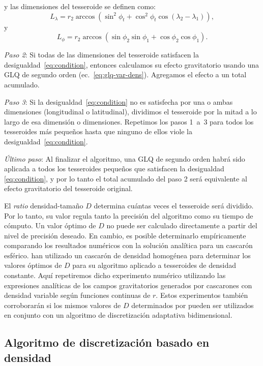 \noindent
y las dimensiones del tesseroide se definen como:
%
\begin{equation}
    L_\lambda = r_2 \arccos(\sin^2\phi_t +
        \cos^2\phi_t\cos(\lambda_2 - \lambda_1)),
    \label{eq:sizelon}
\end{equation}
%
y
%
\begin{equation}
    L_\phi = r_2 \arccos(\sin\phi_2\sin\phi_1 + \cos\phi_2\cos\phi_1).
\end{equation}

\textit{Paso 2}:
Si todas de las dimensiones del tesseroide satisfacen la
desigualdad~\ref{eq:condition}, entonces calculamos su efecto gravitatorio
usando una \ac{GLQ} de segundo orden (ec.~\ref{eq:glq-var-dens}).
Agregamos el efecto a un total acumulado.

\textit{Paso 3}:
Si la desigualdad~\ref{eq:condition} no es satisfecha por una o ambas
dimensiones (longitudinal o latitudinal), dividimos el tesseroide por la mitad
a lo largo de esa dimensión o dimensiones.
Repetimos los pasos 1~a~3 para todos los tesseroides más pequeños hasta que
ninguno de ellos viole la desigualdad~\ref{eq:condition}.

\textit{Último paso}:
Al finalizar el algoritmo, una \ac{GLQ} de segundo orden habrá sido aplicada
a todos los tesseroides pequeños que satisfacen la desigualdad
\ref{eq:condition}, y por lo tanto el total acumulado del paso 2 será
equivalente al efecto gravitatorio del tesseroide original.

El \emph{ratio} densidad-tamaño $D$ determina cuántas veces el tesseroide será
dividido.
Por lo tanto, su valor regula tanto la precisión del algoritmo como su tiempo
de cómputo.
Un valor óptimo de $D$ no puede ser calculado directamente a partir del nivel
de precisión deseado.
En cambio, es posible determinarlo empíricamente comparando los resultados
numéricos con la solución analítica para un cascarón esférico.
\citet{uieda2016} han utilizado un cascarón de densidad homogénea para
determinar los valores óptimos de $D$ para su algoritmo aplicado a tesseroides
de densidad constante.
Aquí repetiremos dicho experimento numérico utilizando las expresiones
analíticas de los campos gravitatorios generados por cascarones con densidad
variable según funciones continuas de $r$.
Estos experimentos también corroborarán si los mismos valores de $D$
determinados por \citet{uieda2016} pueden ser utilizados en conjunto con un
algoritmo de discretización adaptativa bidimensional.


\subsection{Algoritmo de discretización basado en densidad}

